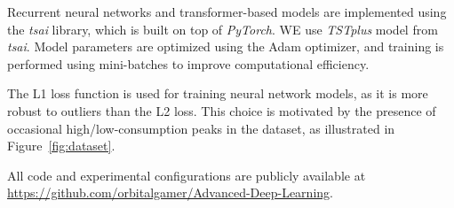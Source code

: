 \par
Recurrent neural networks and transformer-based models are implemented using the \textit{tsai} library, which is built on top of \textit{PyTorch}. WE use \textit{TSTplus} model from \textit{tsai}. Model parameters are optimized using the Adam optimizer, and training is performed using mini-batches to improve computational efficiency.

\par
The L1 loss function is used for training neural network models, as it is more robust to outliers than the L2 loss. This choice is motivated by the presence of occasional high/low-consumption peaks in the dataset, as illustrated in Figure~\ref{fig:dataset}.

\par
All code and experimental configurations are publicly available at \url{https://github.com/orbitalgamer/Advanced-Deep-Learning}.





    
    
    
    
   
    

